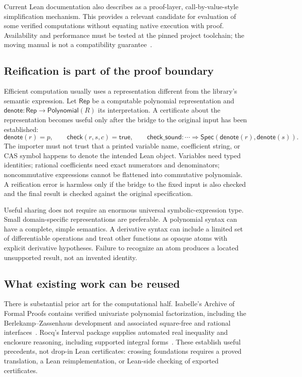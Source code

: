 \documentclass[11pt,a4paper]{article}
\newcommand{\code}[1]{\texttt{\detokenize{#1}}}
\newcommand{\Spec}{\mathsf{Spec}}
\theoremstyle{remark}
\begin{document}
Current Lean documentation also describes \code{cbv} as a proof-layer,
call-by-value-style simplification mechanism. This provides a relevant candidate
for evaluation of some verified computations without equating native execution
with proof. Availability and performance must be tested at the pinned project
toolchain; the moving manual is not a compatibility guarantee~\cite{leancbv}.

\subsection{Reification is part of the proof boundary}
Efficient computation usually uses a representation different from the library's
semantic expression. Let $\mathsf{Rep}$ be a computable polynomial representation
and $\mathsf{denote}:\mathsf{Rep}\to\mathsf{Polynomial}(R)$ its interpretation.
A certificate about the representation becomes useful only after the bridge to
the original input has been established:
\[
 \mathsf{denote}(r)=p,\qquad
 \mathsf{check}(r,s,c)=\mathsf{true},\qquad
 \mathsf{check\_sound}:\cdots\Longrightarrow
   \Spec(\mathsf{denote}(r),\mathsf{denote}(s)).
\]
The importer must not trust that a printed variable name, coefficient string,
or CAS symbol happens to denote the intended Lean object. Variables need typed
identities; rational coefficients need exact numerators and denominators;
noncommutative expressions cannot be flattened into commutative polynomials.
A reification error is harmless only if the bridge to the fixed input is also
checked and the final result is checked against the original specification.

Useful sharing does not require an enormous universal symbolic-expression type.
Small domain-specific representations are preferable. A polynomial syntax can
have a complete, simple semantics. A derivative syntax can include a limited set
of differentiable operations and treat other functions as opaque atoms with
explicit derivative hypotheses. Failure to recognize an atom produces a located
unsupported result, not an invented identity.

\subsection{What existing work can be reused}
There is substantial prior art for the computational half. Isabelle's Archive of
Formal Proofs contains verified univariate polynomial factorization, including
the Berlekamp--Zassenhaus development and associated square-free and rational
interfaces~\cite{berlekamp}. Rocq's Interval package supplies automated real
inequality and enclosure reasoning, including supported integral
forms~\cite{interval}. These establish useful precedents, not drop-in Lean
certificates: crossing foundations requires a proved translation, a Lean
reimplementation, or Lean-side checking of exported certificates.
\end{document}
